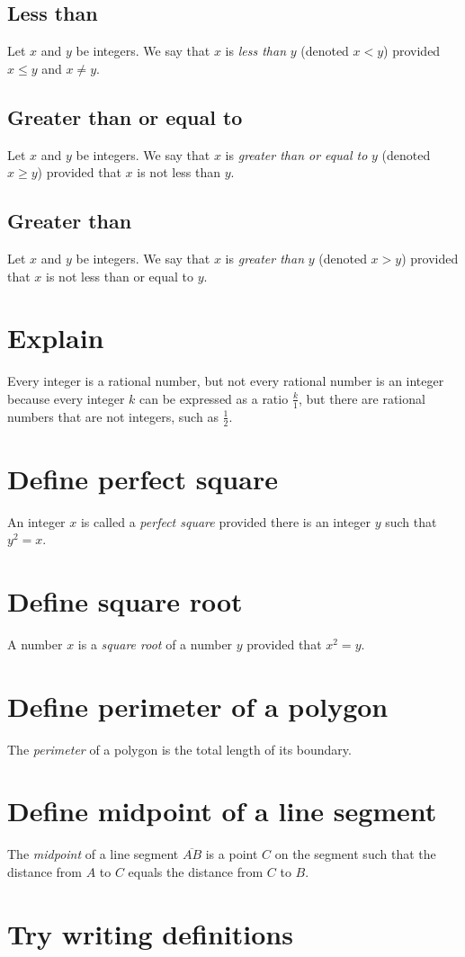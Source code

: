 \documentclass[12pt]{article}
\begin{document}
\subsection{Less than}
Let $x$ and $y$ be integers. We say that $x$ is \textit{less than} $y$ (denoted $x<y$) provided $x\leq y$ and $x\neq y$.
\subsection{Greater than or equal to}
Let $x$ and $y$ be integers. We say that $x$ is \textit{greater than or equal to} $y$ (denoted $x\geq y$) provided that $x$ is not less than $y$.
\subsection{Greater than}
Let $x$ and $y$ be integers. We say that $x$ is \textit{greater than} $y$ (denoted $x>y$) provided that $x$ is not less than or equal to $y$.
\section{Explain}
Every integer is a rational number, but not every rational number is an integer because every integer $k$ can be expressed as a ratio $\frac{k}{1}$, but there are rational numbers that are not integers, such as $\frac{1}{2}.$
\section{Define perfect square}
An integer $x$ is called a \textit{perfect square} provided there is an integer $y$ such that $y^2=x$.
\section{Define square root}
A number $x$ is a \textit{square root} of a number $y$ provided that $x^2=y$.
\section{Define perimeter of a polygon}
The \textit{perimeter} of a polygon is the total length of its boundary.
\section{Define midpoint of a line segment}
The \textit{midpoint} of a line segment $\overline{AB}$ is a point $C$ on the segment such that the distance from $A$ to $C$ equals the distance from $C$ to $B$.
\section{Try writing definitions}
\end{document}
